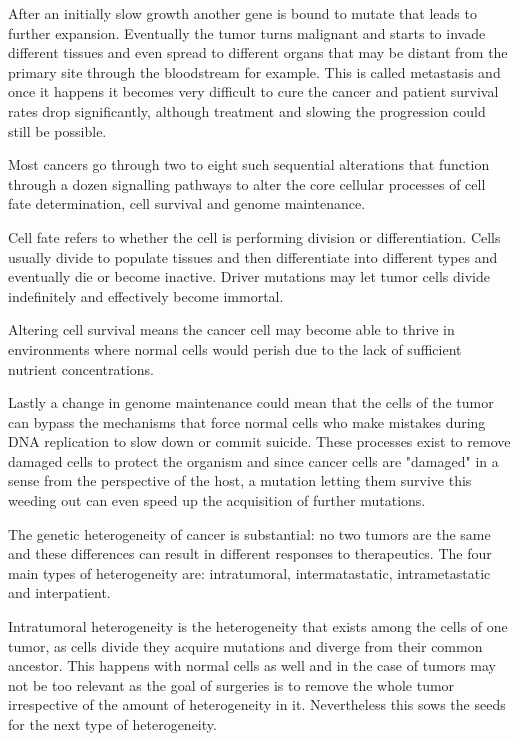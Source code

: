 \documentclass[bsc,frontabs,singlespacing,parskip,deptreport]{infthesis}
\begin{document}
After an initially slow growth another gene is bound to mutate that leads to further expansion. Eventually the tumor turns malignant and starts to invade different tissues and even spread to different organs that may be distant from the primary site through the bloodstream for example. This is called metastasis and once it happens it becomes very difficult to cure the cancer and patient survival rates drop significantly, although treatment and slowing the progression could still be possible.

Most cancers go through two to eight such sequential alterations that function through a dozen signalling pathways to alter the core cellular processes of cell fate determination, cell survival and genome maintenance.

Cell fate refers to whether the cell is performing division or differentiation. Cells usually divide to populate tissues and then differentiate into different types and eventually die or become inactive. Driver mutations may let tumor cells divide indefinitely and effectively become immortal.

Altering cell survival means the cancer cell may become able to thrive in environments where normal cells would perish due to the lack of sufficient nutrient concentrations.

Lastly a change in genome maintenance could mean that the cells of the tumor can bypass the mechanisms that force normal cells who make mistakes during DNA replication to slow down or commit suicide. These processes exist to remove damaged cells to protect the organism and since cancer cells are "damaged" in a sense from the perspective of the host, a mutation letting them survive this weeding out can even speed up the acquisition of further mutations.

The genetic heterogeneity of cancer is substantial: no two tumors are the same and these differences can result in different responses to therapeutics. The four main types of heterogeneity are: intratumoral, intermatastatic, intrametastatic and interpatient.

Intratumoral heterogeneity is the heterogeneity that exists among the cells of one tumor, as cells divide they acquire mutations and diverge from their common ancestor. This happens with normal cells as well and in the case of tumors may not be too relevant as the goal of surgeries is to remove the whole tumor irrespective of the amount of heterogeneity in it. Nevertheless this sows the seeds for the next type of heterogeneity.
\end{document}
